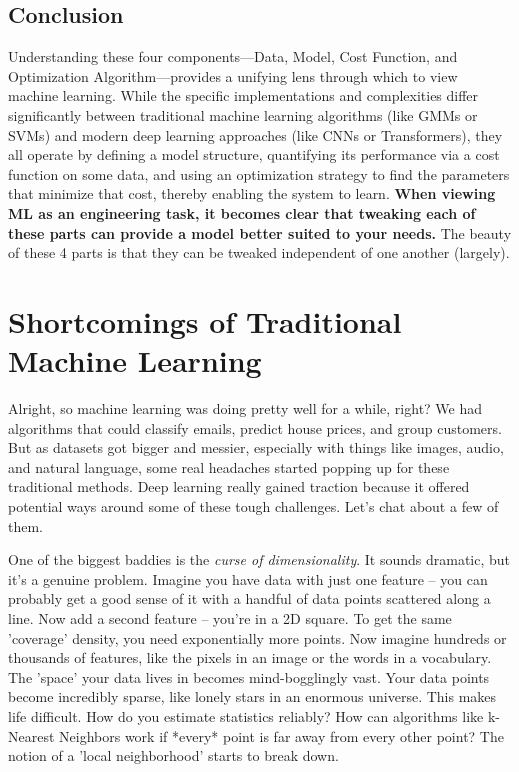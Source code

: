 \documentclass{article}
\begin{document}
\subsection{Conclusion}

Understanding these four components---Data, Model, Cost Function, and Optimization Algorithm---provides a unifying lens through which to view machine learning. While the specific implementations and complexities differ significantly between traditional machine learning algorithms (like GMMs or SVMs) and modern deep learning approaches (like CNNs or Transformers), they all operate by defining a model structure, quantifying its performance via a cost function on some data, and using an optimization strategy to find the parameters that minimize that cost, thereby enabling the system to learn. \textbf{When viewing ML as an engineering task, it becomes clear that tweaking each of these parts can provide a model better suited to your needs.} The beauty of these 4 parts is that they can be tweaked independent of one another (largely). 



\section{Shortcomings of Traditional Machine Learning}

Alright, so machine learning was doing pretty well for a while, right? We had algorithms that could classify emails, predict house prices, and group customers. But as datasets got bigger and messier, especially with things like images, audio, and natural language, some real headaches started popping up for these traditional methods. Deep learning really gained traction because it offered potential ways around some of these tough challenges. Let's chat about a few of them.

One of the biggest baddies is the \emph{curse of dimensionality}. It sounds dramatic, but it's a genuine problem. Imagine you have data with just one feature – you can probably get a good sense of it with a handful of data points scattered along a line. Now add a second feature – you're in a 2D square. To get the same 'coverage' density, you need exponentially more points. Now imagine hundreds or thousands of features, like the pixels in an image or the words in a vocabulary. The 'space' your data lives in becomes mind-bogglingly vast. Your data points become incredibly sparse, like lonely stars in an enormous universe. This makes life difficult. How do you estimate statistics reliably? How can algorithms like k-Nearest Neighbors work if *every* point is far away from every other point? The notion of a 'local neighborhood' starts to break down.
\end{document}
